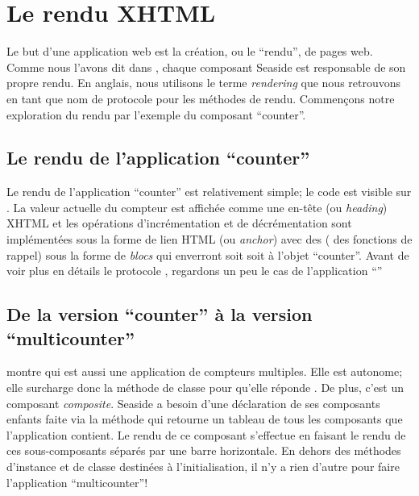 \documentclass[a4paper,10pt,twoside]{book}
\begin{document}
\section{Le rendu XHTML}

Le but d'une application web est la création, ou le ``rendu'', de pages web.
Comme nous l'avons dit dans , chaque composant
Seaside est responsable de son propre rendu.
En anglais, nous utilisons le terme \emph{rendering} que nous
retrouvons en tant que nom de protocole pour les méthodes de rendu.
Commençons notre exploration du rendu par l'exemple du composant ``counter''.

\subsection{Le rendu de l'application ``counter''}

Le rendu de l'application ``counter'' est relativement simple; le code
est visible sur .
La valeur actuelle du compteur est affichée comme une en-tête (ou
\emph{heading}) XHTML et les opérations d'incrémentation et de
décrémentation sont implémentées sous la forme de lien HTML (ou
\emph{anchor}) avec des \callbacks (\ie{} des fonctions
de rappel) sous la forme de \emph{blocs} qui enverront soit
 soit  à l'objet ``counter''.
Avant de voir plus en détails le protocole , regardons
un peu le cas de l'application ``''

\subsection{De la version ``counter'' à la version ``multicounter''}

 montre  qui est
aussi une application
de compteurs multiples. Elle est autonome; elle surcharge donc la méthode de
classe  pour qu'elle réponde
.
De plus, c'est un composant \emph{composite}. Seaside a besoin d'une
déclaration de ses composants enfants faite via la méthode
 qui retourne un tableau de tous les composants que
l'application contient.
Le rendu de ce composant s'effectue en faisant le rendu de ces
sous-composants séparés par une barre horizontale.
En dehors des méthodes d'instance et de classe destinées à
l'initialisation, il n'y a rien d'autre pour faire l'application
``multicounter''!
\end{document}
